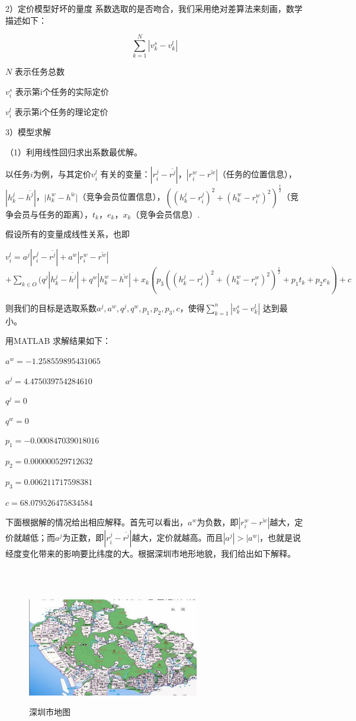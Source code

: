 \documentclass{ctexart}
\begin{document}
2）定价模型好坏的量度
系数选取的是否吻合，我们采用绝对差算法来刻画，数学描述如下：

$$ \sum^{N}_{k=1}|v^{s}_{k}-v^{l}_{k}|$$

$N$  表示任务总数

   $v^{s}_{i}$  表示第i个任务的实际定价

$v^{l}_{i}$   表示第i个任务的理论定价

3）模型求解

（1）利用线性回归求出系数最优解。

以任务$i$为例，与其定价$v^{l}_{i}$  有关的变量：$|r^{j}_{i} -\overline{r^{j}}|$，$|r^{w}_{i}-\overline{r^{w}}|$（任务的位置信息），$|h^{j}_{k}-\overline{h^{j}}|$，$|h^{w}_{k}-\overline{h^{w}|}$（竞争会员位置信息），$((h^{j}_{k}-r^{j}_{i})^{2}+(h^{w}_{k}-r^{w}_{i})^{2})^{\frac{1}{2}}$（竞争会员与任务的距离），$t_{k}$，$e_{k}$，$x_{k}$（竞争会员信息）.

假设所有的变量成线性关系，也即


$v^{l}_{i}=a^{j}|r^{j}_{i}-\overline{r^{j}}|+a^{w}|r^{w}_{i}-\overline{r^{w}}|$
$+\sum\limits_{k\in O}(q^{j}|h^{j}_{k}-\overline{h^{j}}|+q^{w}|h^{w}_{k}-\overline{h^{w}}|+x_{k}(p_{3}((h^{j}_{k}-r^{j}_{i})^{2}+(h^{w}_{k}-r^{w}_{i})^{2})^{\frac{1}{2}}+p_{1}t_{k}+p_{2}e_{k})+c$


则我们的目标是选取系数$a^{j},a^{w},q^{j},q^{w},p_{1},p_{2},p_{3} ,c$，使得$ \sum\limits^{n}_{k=1}|v^{s}_{k}-v^{l}_{k}|$ 达到最小。

用MATLAB 求解结果如下：

$a^{w}= -1.258559895431065$

 $a^{j} =4.475039754284610$


$q^{j}=0$

           $q^{w}=0$


$p_{1} = -0.000847039018016$

$p_{2}=0.000000529712632$

 $p_{3}=0.006211717598381$

$c=68.079526475834584$

下面根据解的情况给出相应解释。首先可以看出，$a^{w}$为负数，即$|r^{w}_{i}-\overline{r^{w}}|$越大，定价就越低；而$a^{j}$为正数，即$|r^{j}_{i}-\overline{r^{j}}|$越大，定价就越高。而且$|a^{j}|>|a^{w}|$，也就是说经度变化带来的影响要比纬度的大。根据深圳市地形地貌，我们给出如下解释。

\
\begin{figure}
 \ \ \ \ \ \ \ \ \ \ \ \ \ \  \ \ \ \  \ \ \ \  \ \ \  \ \  \ \ \ \includegraphics[width=7.5cm]{4.jpg}
\caption*{深圳市地图}
\end{figure}
\end{document}
